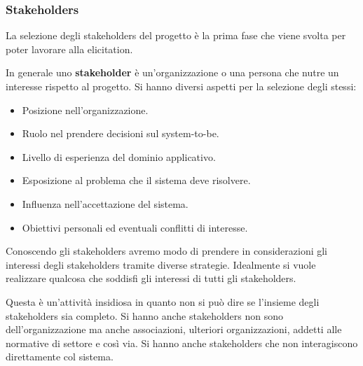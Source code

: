 \subsubsection{Stakeholders}
La selezione degli stakeholders del progetto è la prima fase che viene svolta
per poter lavorare alla elicitation.
\begin{definizione}
      In generale uno \textbf{stakeholder} è un'organizzazione o una persona che
      nutre un interesse rispetto al progetto. Si hanno diversi aspetti per la
      selezione degli stessi:
      \begin{itemize}
            \item Posizione nell'organizzazione.
            \item Ruolo nel prendere decisioni sul system-to-be.
            \item Livello di esperienza del dominio applicativo.
            \item Esposizione al problema che il sistema deve risolvere.
            \item Influenza nell'accettazione del sistema.
            \item Obiettivi personali ed eventuali conflitti di interesse.
      \end{itemize}
\end{definizione}
Conoscendo gli stakeholders avremo modo di prendere in considerazioni gli interessi
degli stakeholders tramite diverse strategie. Idealmente si vuole realizzare
qualcosa che soddisfi gli interessi di tutti gli stakeholders.

Questa è un'attività insidiosa in quanto non si può dire se l'insieme degli
stakeholders sia completo. Si hanno anche stakeholders non sono dell'organizzazione
ma anche associazioni, ulteriori organizzazioni, addetti alle normative di settore
e così via. Si hanno anche stakeholders che non interagiscono direttamente col sistema.

